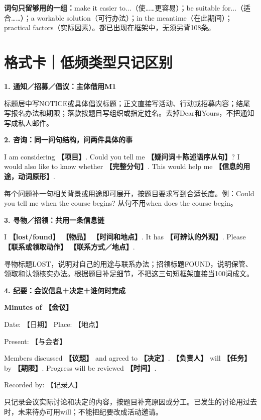 \documentclass[11pt,a4paper,fontset=macnew]{ctexart}
\newenvironment{example}{\begingroup\fontsize{10.5}{14}\selectfont\setlength{\parskip}{4pt}}{\par\endgroup}
\begin{document}
{\small\textbf{词句只留够用的一组：}make it easier to...（使……更容易）；be suitable for...（适合……）；a workable solution（可行办法）；in the meantime（在此期间）；practical factors（实际因素）。都已出现在框架中，无须另背108条。}\par
\clearpage\section*{格式卡｜低频类型只记区别}
\par\vspace{5pt}\noindent\textbf{1. 通知／招募／倡议：主体借用M1}\par\nopagebreak
标题居中写NOTICE或具体倡议标题；正文直接写活动、行动或招募内容；结尾写报名办法和期限；落款按题目写组织或指定姓名。去掉Dear和Yours，不把通知写成私人邮件。

\par\vspace{5pt}\noindent\textbf{2. 咨询：同一问句结构，问两件具体的事}\par\nopagebreak
\begin{example}I am considering \textbf{【项目】}. Could you tell me \textbf{【疑问词＋陈述语序从句】}? I would also like to know whether \textbf{【完整分句】}. This would help me \textbf{【信息的用途，动词原形】}.

\end{example}
每个问题补一句相关背景或用途即可展开，按题目要求写到合适长度。例：Could you tell me when the course begins? 从句不用when does the course begin。

\par\vspace{5pt}\noindent\textbf{3. 寻物／招领：共用一条信息链}\par\nopagebreak
\begin{example}I \textbf{【lost/found】} \textbf{【物品】} \textbf{【时间和地点】}. It has \textbf{【可辨认的外观】}. Please \textbf{【联系或领取动作】} \textbf{【联系方式／地点】}.

\end{example}
寻物标题LOST，说明对自己的用途与联系办法；招领标题FOUND，说明保管、领取和认领核实办法。根据题目补足细节，不把这三句短框架直接当100词成文。

\par\vspace{5pt}\noindent\textbf{4. 纪要：会议信息＋决定＋谁何时完成}\par\nopagebreak
\begin{example}\textbf{Minutes of 【会议】}\par Date: 【日期】 \quad Place: 【地点】\par Present: 【与会者】\par
Members discussed \textbf{【议题】} and agreed to \textbf{【决定】}. \textbf{【负责人】} will \textbf{【任务】} by \textbf{【期限】}. Progress will be reviewed \textbf{【时间】}.

Recorded by: 【记录人】\par\end{example}
只记录会议实际讨论和决定的内容，按题目补充原因或分工。已发生的讨论用过去时，未来待办可用will；不能把纪要改成活动邀请。
\end{document}
